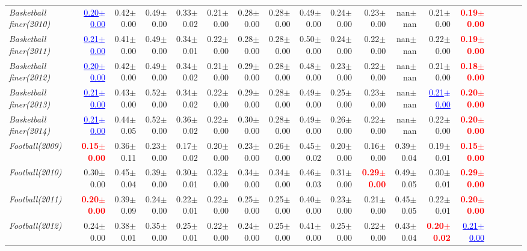 \documentclass[nohyperref]{article}
\theoremstyle{plain}
\theoremstyle{definition}
\theoremstyle{remark}
\newcommand{\red}[1]{\textcolor{red}{\textbf{#1}}}
\newcommand{\blue}[1]{\textcolor{blue}{\underline{#1}}}
\begin{document}
\begin{table*}[!ht]
{\begin{tabular}{lrrrrrrrrrrrrrrrrr}
			{\it Basketball finer(2010)} & \blue{0.20$\pm$0.00} & 0.42$\pm$0.00 & 0.49$\pm$0.00 & 0.33$\pm$0.02 & 0.21$\pm$0.00 & 0.28$\pm$0.00 & 0.28$\pm$0.00 & 0.49$\pm$0.00 & 0.24$\pm$0.00 & 0.23$\pm$0.00 & nan$\pm$nan & 0.21$\pm$0.00 & \red{0.19$\pm$0.00} \\
			{\it Basketball finer(2011)} & \blue{0.21$\pm$0.00} & 0.41$\pm$0.00 & 0.49$\pm$0.00 & 0.34$\pm$0.01 & 0.22$\pm$0.00 & 0.28$\pm$0.00 & 0.28$\pm$0.00 & 0.50$\pm$0.00 & 0.24$\pm$0.00 & 0.22$\pm$0.00 & nan$\pm$nan & 0.22$\pm$0.00 & \red{0.19$\pm$0.00} \\
			{\it Basketball finer(2012)} & \blue{0.20$\pm$0.00} & 0.42$\pm$0.00 & 0.49$\pm$0.00 & 0.34$\pm$0.02 & 0.21$\pm$0.00 & 0.29$\pm$0.00 & 0.28$\pm$0.00 & 0.48$\pm$0.00 & 0.23$\pm$0.00 & 0.22$\pm$0.00 & nan$\pm$nan & 0.21$\pm$0.00 & \red{0.18$\pm$0.00} \\
			{\it Basketball finer(2013)} & \blue{0.21$\pm$0.00} & 0.43$\pm$0.00 & 0.52$\pm$0.00 & 0.34$\pm$0.02 & 0.22$\pm$0.00 & 0.29$\pm$0.00 & 0.28$\pm$0.00 & 0.49$\pm$0.00 & 0.25$\pm$0.00 & 0.23$\pm$0.00 & nan$\pm$nan & \blue{0.21$\pm$0.00} & \red{0.20$\pm$0.00} \\
			{\it Basketball finer(2014)} & \blue{0.21$\pm$0.00} & 0.44$\pm$0.05 & 0.52$\pm$0.00 & 0.36$\pm$0.02 & 0.22$\pm$0.00 & 0.30$\pm$0.00 & 0.28$\pm$0.00 & 0.49$\pm$0.00 & 0.26$\pm$0.00 & 0.22$\pm$0.00 & nan$\pm$nan & 0.22$\pm$0.00 & \red{0.20$\pm$0.00} \\
			{\it Football(2009)} & \red{0.15$\pm$0.00} & 0.36$\pm$0.11 & 0.23$\pm$0.00 & 0.17$\pm$0.02 & 0.20$\pm$0.00 & 0.23$\pm$0.00 & 0.26$\pm$0.00 & 0.45$\pm$0.02 & 0.20$\pm$0.00 & 0.16$\pm$0.00 & 0.39$\pm$0.04 & 0.19$\pm$0.01 & \red{0.15$\pm$0.00} \\
			{\it Football(2010)} & 0.30$\pm$0.00 & 0.45$\pm$0.04 & 0.39$\pm$0.00 & 0.30$\pm$0.01 & 0.32$\pm$0.00 & 0.34$\pm$0.00 & 0.34$\pm$0.00 & 0.46$\pm$0.03 & 0.31$\pm$0.00 & \red{0.29$\pm$0.00} & 0.49$\pm$0.05 & 0.30$\pm$0.01 & \red{0.29$\pm$0.00} \\
			{\it Football(2011)} & \red{0.20$\pm$0.00} & 0.39$\pm$0.09 & 0.24$\pm$0.00 & 0.22$\pm$0.01 & 0.22$\pm$0.00 & 0.25$\pm$0.00 & 0.25$\pm$0.00 & 0.40$\pm$0.00 & 0.23$\pm$0.00 & 0.21$\pm$0.00 & 0.45$\pm$0.05 & 0.22$\pm$0.01 & \red{0.20$\pm$0.00} \\
			{\it Football(2012)} & 0.24$\pm$0.00 & 0.38$\pm$0.01 & 0.35$\pm$0.00 & 0.25$\pm$0.01 & 0.22$\pm$0.00 & 0.24$\pm$0.00 & 0.25$\pm$0.00 & 0.41$\pm$0.00 & 0.25$\pm$0.00 & 0.22$\pm$0.00 & 0.43$\pm$0.04 & \red{0.20$\pm$0.02} & \blue{0.21$\pm$0.00} \\

\end{tabular}}
\end{table*}
\end{document}
